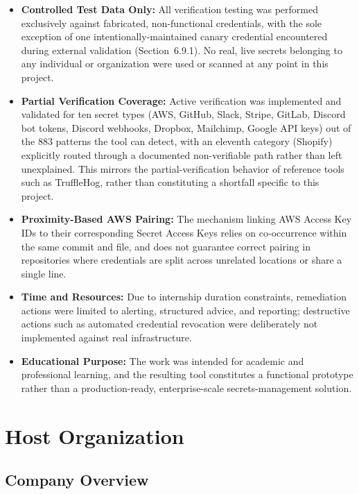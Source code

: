 \documentclass[12pt]{article}
\begin{document}
\begin{itemize}
    \item \textbf{Controlled Test Data Only:} All verification testing was performed exclusively against fabricated, non-functional credentials, with the sole exception of one intentionally-maintained canary credential encountered during external validation (Section~6.9.1). No real, live secrets belonging to any individual or organization were used or scanned at any point in this project.
    \item \textbf{Partial Verification Coverage:} Active verification was implemented and validated for ten secret types (AWS, GitHub, Slack, Stripe, GitLab, Discord bot tokens, Discord webhooks, Dropbox, Mailchimp, Google API keys) out of the 883 patterns the tool can detect, with an eleventh category (Shopify) explicitly routed through a documented non-verifiable path rather than left unexplained. This mirrors the partial-verification behavior of reference tools such as TruffleHog, rather than constituting a shortfall specific to this project.
    \item \textbf{Proximity-Based AWS Pairing:} The mechanism linking AWS Access Key IDs to their corresponding Secret Access Keys relies on co-occurrence within the same commit and file, and does not guarantee correct pairing in repositories where credentials are split across unrelated locations or share a single line.
    \item \textbf{Time and Resources:} Due to internship duration constraints, remediation actions were limited to alerting, structured advice, and reporting; destructive actions such as automated credential revocation were deliberately not implemented against real infrastructure.
    \item \textbf{Educational Purpose:} The work was intended for academic and professional learning, and the resulting tool constitutes a functional prototype rather than a production-ready, enterprise-scale secrets-management solution.
\end{itemize}

\newpage

\section{Host Organization}

\subsection{Company Overview}
\end{document}
